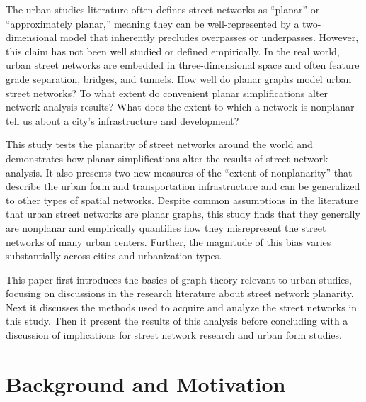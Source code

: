 \documentclass[Afour,sageh,times]{sagej}
\begin{document}
The urban studies literature often defines street networks as \enquote{planar} or \enquote{approximately planar,} meaning they can be well-represented by a two-dimensional model that inherently precludes overpasses or underpasses. However, this claim has not been well studied or defined empirically. In the real world, urban street networks are embedded in three-dimensional space and often feature grade separation, bridges, and tunnels. How well do planar graphs model urban street networks? To what extent do convenient planar simplifications alter network analysis results? What does the extent to which a network is nonplanar tell us about a city's infrastructure and development?

This study tests the planarity of street networks around the world and demonstrates how planar simplifications alter the results of street network analysis. It also presents two new measures of the \enquote{extent of nonplanarity} that describe the urban form and transportation infrastructure and can be generalized to other types of spatial networks. Despite common assumptions in the literature that urban street networks are planar graphs, this study finds that they generally are nonplanar and empirically quantifies how they misrepresent the street networks of many urban centers. Further, the magnitude of this bias varies substantially across cities and urbanization types.

This paper first introduces the basics of graph theory relevant to urban studies, focusing on discussions in the research literature about street network planarity. Next it discusses the methods used to acquire and analyze the street networks in this study. Then it present the results of this analysis before concluding with a discussion of implications for street network research and urban form studies.


\section{Background and Motivation}
\end{document}
